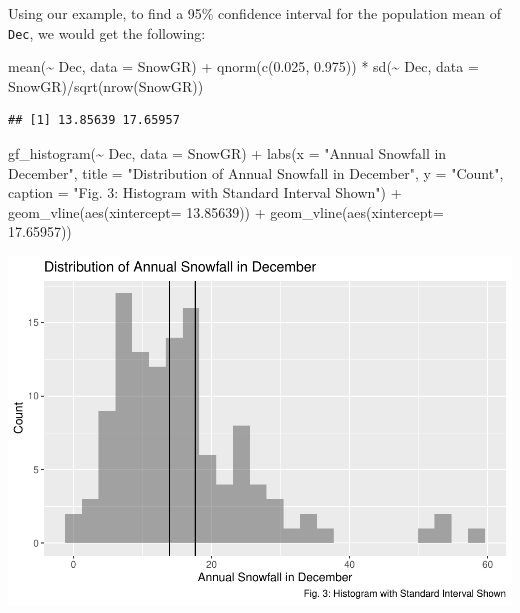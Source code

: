 \documentclass[12pt]{article}
\newenvironment{Shaded}{\begin{snugshade}}{\end{snugshade}}
\newcommand{\AttributeTok}[1]{\textcolor[rgb]{0.77,0.63,0.00}{#1}}
\newcommand{\FloatTok}[1]{\textcolor[rgb]{0.00,0.00,0.81}{#1}}
\newcommand{\FunctionTok}[1]{\textcolor[rgb]{0.00,0.00,0.00}{#1}}
\newcommand{\NormalTok}[1]{#1}
\newcommand{\SpecialCharTok}[1]{\textcolor[rgb]{0.00,0.00,0.00}{#1}}
\newcommand{\StringTok}[1]{\textcolor[rgb]{0.31,0.60,0.02}{#1}}
\begin{document}
Using our example, to find a 95\% confidence interval for the population
mean of \texttt{Dec}, we would get the following:

\begin{Shaded}
\begin{Highlighting}[]
\FunctionTok{mean}\NormalTok{(}\SpecialCharTok{\textasciitilde{}}\NormalTok{ Dec, }\AttributeTok{data =}\NormalTok{ SnowGR) }\SpecialCharTok{+} \FunctionTok{qnorm}\NormalTok{(}\FunctionTok{c}\NormalTok{(}\FloatTok{0.025}\NormalTok{, }\FloatTok{0.975}\NormalTok{)) }\SpecialCharTok{*} 
  \FunctionTok{sd}\NormalTok{(}\SpecialCharTok{\textasciitilde{}}\NormalTok{ Dec, }\AttributeTok{data =}\NormalTok{ SnowGR)}\SpecialCharTok{/}\FunctionTok{sqrt}\NormalTok{(}\FunctionTok{nrow}\NormalTok{(SnowGR))}
\end{Highlighting}
\end{Shaded}

\begin{verbatim}
## [1] 13.85639 17.65957
\end{verbatim}

\begin{Shaded}
\begin{Highlighting}[]
\FunctionTok{gf\_histogram}\NormalTok{(}\SpecialCharTok{\textasciitilde{}}\NormalTok{ Dec, }\AttributeTok{data =}\NormalTok{ SnowGR) }\SpecialCharTok{+}
  \FunctionTok{labs}\NormalTok{(}\AttributeTok{x =} \StringTok{"Annual Snowfall in December"}\NormalTok{, }
       \AttributeTok{title =} \StringTok{"Distribution of Annual Snowfall in December"}\NormalTok{, }\AttributeTok{y =} \StringTok{"Count"}\NormalTok{,}
       \AttributeTok{caption =} \StringTok{"Fig. 3: Histogram with Standard Interval Shown"}\NormalTok{) }\SpecialCharTok{+}
  \FunctionTok{geom\_vline}\NormalTok{(}\FunctionTok{aes}\NormalTok{(}\AttributeTok{xintercept=} \FloatTok{13.85639}\NormalTok{)) }\SpecialCharTok{+}
  \FunctionTok{geom\_vline}\NormalTok{(}\FunctionTok{aes}\NormalTok{(}\AttributeTok{xintercept=} \FloatTok{17.65957}\NormalTok{))}
\end{Highlighting}
\end{Shaded}

\includegraphics{paper_files/figure-latex/unnamed-chunk-5-1.pdf}
\end{document}
